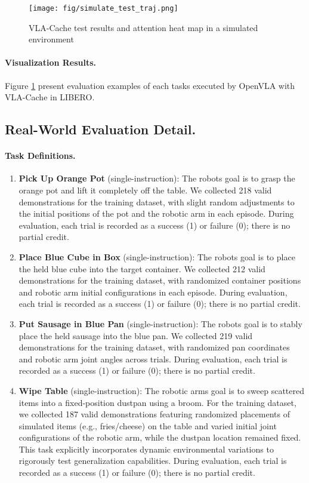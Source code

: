 \begin{figure}[!t]
    \centering
    \texttt{[image: fig/simulate\_test\_traj.png]}
    \caption{VLA-Cache test results and attention heat map in a simulated environment}
    \label{fig:simulate_test_traj}
\end{figure}

\paragraph{Visualization Results.}
Figure \ref{fig:simulate_test_traj} present evaluation examples of each tasks executed by OpenVLA with VLA-Cache in LIBERO.

\subsection{Real-World Evaluation Detail.}

\paragraph{Task Definitions.}

\begin{enumerate}
    \item \textbf{Pick Up Orange Pot} (single-instruction): The robot\textquotesingle s goal is to grasp the orange pot and lift it completely off the table. We collected 218 valid demonstrations for the training dataset, with slight random adjustments to the initial positions of the pot and the robotic arm in each episode. During evaluation, each trial is recorded as a success (1) or failure (0); there is no partial credit.
    \item \textbf{Place Blue Cube in Box} (single-instruction): The robot\textquotesingle s goal is to place the held blue cube into the target container. We collected 212 valid demonstrations for the training dataset, with randomized container positions and robotic arm initial configurations in each episode. During evaluation, each trial is recorded as a success (1) or failure (0); there is no partial credit.
    \item \textbf{Put Sausage in Blue Pan} (single-instruction): The robot\textquotesingle s goal is to stably place the held sausage into the blue pan. We collected 219 valid demonstrations for the training dataset, with randomized pan coordinates and robotic arm joint angles across trials. During evaluation, each trial is recorded as a success (1) or failure (0); there is no partial credit.
    \item \textbf{Wipe Table} (single-instruction): The robotic arm\textquotesingle s goal is to sweep scattered items into a fixed-position dustpan using a broom. For the training dataset, we collected 187 valid demonstrations featuring randomized placements of simulated items (e.g., fries/cheese) on the table and varied initial joint configurations of the robotic arm, while the dustpan location remained fixed. This task explicitly incorporates dynamic environmental variations to rigorously test generalization capabilities. During evaluation, each trial is recorded as a success (1) or failure (0); there is no partial credit.
\end{enumerate}

